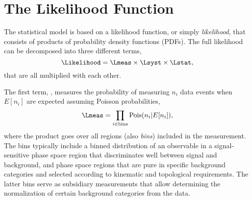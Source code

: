 
\section{The Likelihood Function}
\label{sec:likelihood}
The statistical model is based on a likelihood function, or simply \emph{likelihood}, that consists of products of probability density functions (PDFs). The full likelihood can be decomposed into three different terms,
\begin{equation}
    \label{eq:likelihood-three-terms}
    \Likelihood = \Lmeas \times \Lsyst \times \Lstat,
\end{equation}
that are all multiplied with each other.

The first term, \Lmeas, measures the probability of measuring $n_i$ data events when $E[n_i]$ are expected assuming Poisson probabilities, 
\begin{equation}
    \Lmeas = \prod_{i \in \text{bins}} \text{Pois}(n_i | E[n_i] ),
\end{equation}
where the product goes over all regions (also \emph{bins}) included in the measurement. The bins typically include a binned distribution of an observable in a signal-sensitive phase space region that discriminates well between signal and background, and phase space regions that are pure in specific background categories and selected according to kinematic and topological requirements. The latter bins serve as subsidiary measurements that allow determining the normalization of certain background categories from the data.

